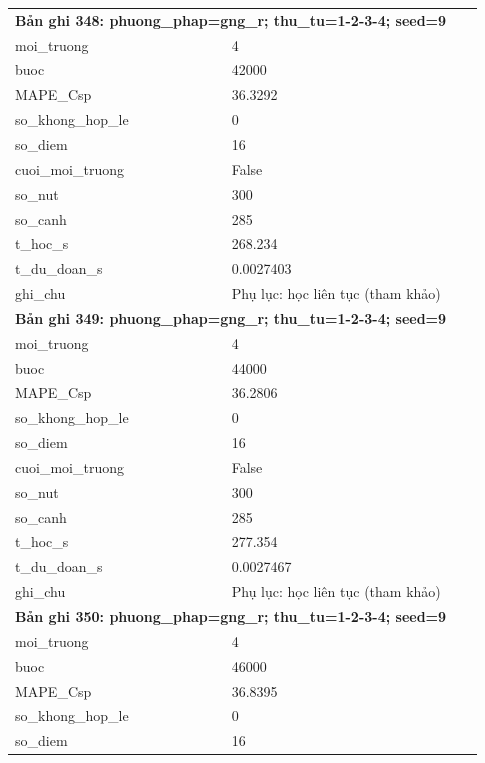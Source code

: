 \begin{longtable}{p{0.43\linewidth}p{0.50\linewidth}}
\midrule
\multicolumn{2}{p{0.95\linewidth}}{\textbf{Bản ghi 348: phuong\_phap=gng\_r; thu\_tu=1-2-3-4; seed=9}} \\
moi\_\allowbreak truong & 4 \\
buoc & 42000 \\
MAPE\_\allowbreak Csp & 36.3292 \\
so\_\allowbreak khong\_\allowbreak hop\_\allowbreak le & 0 \\
so\_\allowbreak diem & 16 \\
cuoi\_\allowbreak moi\_\allowbreak truong & False \\
so\_\allowbreak nut & 300 \\
so\_\allowbreak canh & 285 \\
t\_\allowbreak hoc\_\allowbreak s & 268.234 \\
t\_\allowbreak du\_\allowbreak doan\_\allowbreak s & 0.0027403 \\
ghi\_\allowbreak chu & Phụ lục: học liên tục (tham khảo) \\
\midrule
\multicolumn{2}{p{0.95\linewidth}}{\textbf{Bản ghi 349: phuong\_phap=gng\_r; thu\_tu=1-2-3-4; seed=9}} \\
moi\_\allowbreak truong & 4 \\
buoc & 44000 \\
MAPE\_\allowbreak Csp & 36.2806 \\
so\_\allowbreak khong\_\allowbreak hop\_\allowbreak le & 0 \\
so\_\allowbreak diem & 16 \\
cuoi\_\allowbreak moi\_\allowbreak truong & False \\
so\_\allowbreak nut & 300 \\
so\_\allowbreak canh & 285 \\
t\_\allowbreak hoc\_\allowbreak s & 277.354 \\
t\_\allowbreak du\_\allowbreak doan\_\allowbreak s & 0.0027467 \\
ghi\_\allowbreak chu & Phụ lục: học liên tục (tham khảo) \\
\midrule
\multicolumn{2}{p{0.95\linewidth}}{\textbf{Bản ghi 350: phuong\_phap=gng\_r; thu\_tu=1-2-3-4; seed=9}} \\
moi\_\allowbreak truong & 4 \\
buoc & 46000 \\
MAPE\_\allowbreak Csp & 36.8395 \\
so\_\allowbreak khong\_\allowbreak hop\_\allowbreak le & 0 \\
so\_\allowbreak diem & 16 \\

\end{longtable}
